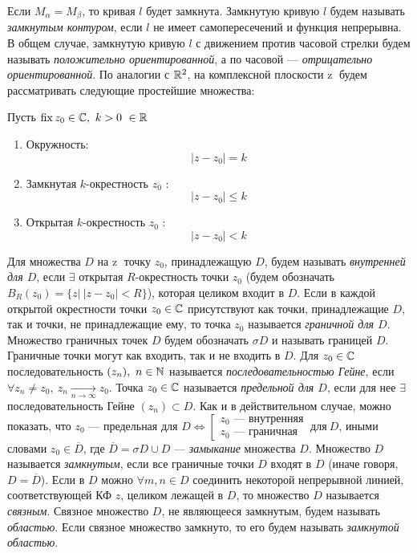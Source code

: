 \documentclass[../../main.tex]{subfiles}
\begin{document}
Если  $M_{\alpha} = M_{\beta}$, то кривая $l$ будет замкнута. 
Замкнутую кривую  $l$ будем называть \emph{замкнутым контуром},
если $l$ не имеет самопересечений и функция непрерывна. В общем
случае, замкнутую кривую  $l$ с движением против часовой стрелки
будем называть \emph{положительно ориентированной}, 
а по часовой ---
\emph{отрицательно ориентированной}. По аналогии  с $\mathbb{R}^2$,
 на комплексной плоскости  \textcircled{z} будем рассматривать 
следующие  простейшие множества:

Пусть $\operatorname{fix}{z_0}\in \mathbb{C},\   k>0\ \in \mathbb{R}$
\begin{enumerate}
\item Окружность: \[  |z - z_0| = k\] 
\item Замкнутая $k$-окрестность $z_0$ : \[ |z - z_0| \leq k\] 
\item Открытая $k$-окрестность $z_0$ : \[ |z - z_0| < k\] 
\end{enumerate}

Для множества $D$ на \textcircled{z} точку $z_0$, принадлежащую  $D$, 
будем называть \emph{внутренней для  $D$}, если $\exists$ открытая 
$R$-окрестность точки $z_0$ (будем обозначать 
$B_R(z_0) = \{ z |\  |z - z_0| < R \}$), которая целиком входит в  $D$.
Если в каждой открытой окрестности точки 
$z_0 \in \mathbb{C}$ присутствуют как точки, принадлежащие $D$, 
так и точки, не принадлежащие ему, то точка $z_0$ называется \emph{граничной для
$D$}.
Множество граничных точек $D$ будем обозначать $\sigma\!{D}$ и называть границей
$D$.
Граничные точки могут как входить, так и не входить в $D$. Для $z_0 \in \mathbb{C}$
последовательность
$(z_n),\ n\in\mathbb{N}$ называется \emph{последовательностью Гейне}, если $\forall
z_n\neq z_0, \ z_n \underset{n \longrightarrow \infty}{\longrightarrow} z_0 $.
 Точка $z_0 \in \mathbb{C}$ называется \emph{предельной для $D$},
если для нее $\exists$ последовательность Гейне $(z_n) \subset D$. Как и в
действительном случае, можно показать,
 что $z_0$ --- предельная для $D \iff
 \left[\begin{aligned} 
  z_0 \text{ --- внутренняя} \\
  z_0 \text{ --- граничная}
\end{aligned}\right. \  \text{для}\ D$, иными словами $z_0 \in \overline{D}$, где
$\overline{D} = \sigma\!{D}\cup D$ --- \emph{замыкание} множества $D$.
 Множество $D$ называется \emph{замкнутым}, если все граничные точки $D$
 входят в $D$ (иначе говоря, $D = \overline{D}$). 
 Если в $D$ можно $\forall m, n \in D$ соединить некоторой непрерывной линией, соответствующей
 КФ $z$, целиком лежащей в $D$, то множество $D$ называется  \emph{связным}.
 Связное множество $D$, не являющееся замкнутым, будем называть \emph{областью}. 
 Если связное множество замкнуто, то его будем называть \emph{замкнутой областью}.
 
\end{document}
